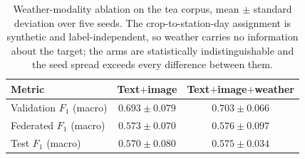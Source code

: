 \begin{table}[t]
\caption{Weather-modality ablation on the tea corpus, mean $\pm$ standard
deviation over five seeds. The crop-to-station-day assignment is synthetic and
label-independent, so weather carries no information about the target; the arms
are statistically indistinguishable and the seed spread exceeds every difference
between them.}
\label{tab:weather_ablation}
\centering\footnotesize
\begin{tabular}{lcc}
\toprule
Metric & Text$+$image & Text$+$image$+$weather\\
\midrule
Validation $F_1$ (macro) & $0.693 \pm 0.079$ & $0.703 \pm 0.066$\\
Federated $F_1$ (macro) & $0.573 \pm 0.070$ & $0.576 \pm 0.097$\\
Test $F_1$ (macro) & $0.570 \pm 0.080$ & $0.575 \pm 0.034$\\
\bottomrule
\end{tabular}
\end{table}
